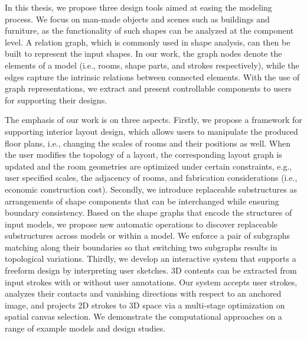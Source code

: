 In this thesis, we propose three design tools aimed at easing the modeling process. We focus on man-made objects and scenes such as buildings and furniture, as the functionality of such shapes can be analyzed at the component level. A relation graph, which is commonly used in shape analysis, can then be built to represent the input shapes. In our work, the graph nodes denote the elements of a model (i.e., rooms, shape parts, and strokes respectively), while the edges capture the intrinsic relations between connected elements. With the use of graph representations, we extract and present controllable components to users for supporting their designs.


 The emphasis of our work is on three aspects. Firstly, we propose a framework for supporting interior layout design, which allows users to manipulate the produced floor plans, i.e., changing the scales of rooms and their positions as well. When the user modifies the topology of a layout, the corresponding layout graph is updated and the room geometries are optimized under certain constraints, e.g., user specified scales, the adjacency of rooms, and fabrication considerations (i.e., economic construction cost). Secondly, we introduce replaceable substructures as arrangements of shape components that can be interchanged while ensuring boundary consistency. Based on the shape graphs that encode the structures of input models, we propose new automatic operations to discover replaceable substructures across models or within a model. We enforce a pair of subgraphs matching along their boundaries so that switching two subgraphs results in topological variations. Thirdly, we develop an interactive system that supports a freeform design by interpreting user sketches. 3D contents can be extracted from input strokes with or without user annotations. Our system accepts user strokes, analyzes their contacts and vanishing directions with respect to an anchored image, and projects 2D strokes to 3D space via a multi-stage optimization on spatial canvas selection. We demonstrate the computational approaches on a range of example models and design studies.










